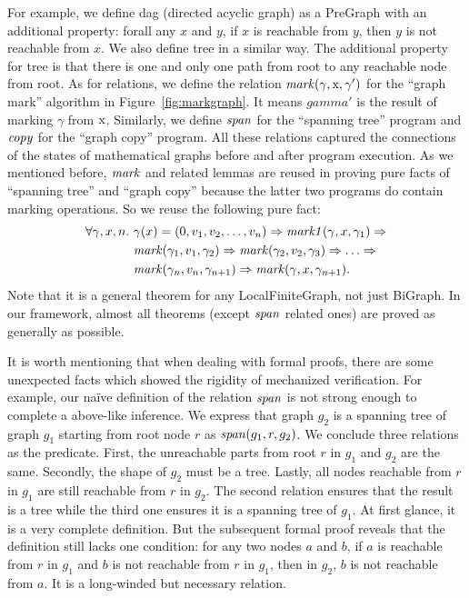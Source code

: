 For example, we define dag (directed acyclic graph) as a PreGraph with
an additional property: forall any $x$ and $y$, if $x$ is reachable
from $y$, then $y$ is not reachable from $x$. We also define tree in a
similar way. The additional property for tree is that there is one and
only one path from root to any reachable node from root. As for
relations, we define the relation $\mathit{mark}(\gamma, \text{x}, \gamma')$
for the ``graph mark'' algorithm in Figure~\ref{fig:markgraph}. It
means $gamma'$ is the result of marking $\gamma$ from $\text{x}$. Similarly, we define $\mathit{span}$ for the ``spanning tree'' program
and $\mathit{copy}$ for the ``graph copy'' program. All these relations
captured the connections of the states of mathematical graphs before
and after program execution. As we mentioned before, $\mathit{mark}$ and
related lemmas are reused in proving pure facts of ``spanning tree''
and ``graph copy'' because the latter two programs do contain marking
operations. So we reuse the following pure fact:
\begin{equation*}
\begin{split}
\forall \gamma, x, n.~&\gamma(x)=(0, v_1, v_2,\dots,v_n) => \mathit{mark1}(\gamma, x, \gamma_1) =>\\
        & \mathit{mark}(\gamma_1,v_1,\gamma_2) => \mathit{mark}(\gamma_2,v_2,\gamma_3) => \dots =>\\
        & \mathit{mark}(\gamma_n,v_n,\gamma_{n+1}) => \mathit{mark}(\gamma,x,\gamma_{n+1}).
\end{split}
\end{equation*}
Note that it is a general theorem for any LocalFiniteGraph, not just
BiGraph. In our framework, almost all theorems (except $\mathit{span}$
related ones) are proved as generally as possible.

It is worth mentioning that when dealing with formal proofs, there are
some unexpected facts which showed the rigidity of mechanized
verification. For example, our na\"ive definition of the relation
$\mathit{span}$ is not strong enough to complete a above-like inference. We
express that graph $g_2$ is a spanning tree of graph $g_1$ starting
from root node $r$ as $\mathit{span}(g_1, r, g_2)$. We conclude three
relations as the predicate. First, the unreachable parts from root $r$
in $g_1$ and $g_2$ are the same. Secondly, the shape of $g_2$ must be
a tree. Lastly, all nodes reachable from $r$ in $g_1$ are still
reachable from $r$ in $g_2$. The second relation ensures that the
result is a tree while the third one ensures it is a spanning tree of
$g_1$. At first glance, it is a very complete definition. But the
subsequent formal proof reveals that the definition still lacks one
condition: for any two nodes $a$ and $b$, if $a$ is reachable from $r$
in $g_1$ and $b$ is not reachable from $r$ in $g_1$, then in $g_2$,
$b$ is not reachable from $a$. It is a long-winded but necessary
relation.
